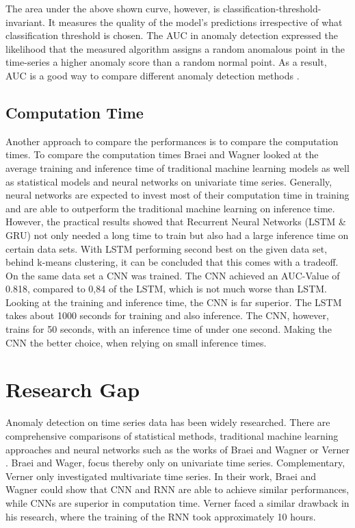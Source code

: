 The area under the above shown curve, however, is classification-threshold-invariant. It measures the quality of the model's predictions irrespective of what classification threshold is chosen. The AUC in anomaly detection expressed the likelihood that the measured algorithm assigns a random anomalous point in the time-series a higher anomaly score than a random normal point. As a result, AUC is a good way to compare different anomaly detection methods \parencite{Braei2020}.

\subsection{Computation Time}
Another approach to compare the performances is to compare the computation times. To compare the computation times Braei and Wagner \parencite*{Braei2020} looked at the average training and inference time of traditional machine learning models as well as  statistical models and neural networks on univariate time series. Generally, neural networks are expected to invest most of their computation time in training and are able to outperform the traditional machine learning on inference time. However, the practical results showed that Recurrent Neural Networks (LSTM \& GRU) not only needed a long time to train but also had a large inference time on certain data sets. With LSTM performing second best on the given data set, behind k-means clustering, it can be concluded that this comes with a tradeoff. On the same data set a CNN was trained. The CNN achieved an AUC-Value of 0.818, compared to 0,84 of the LSTM, which is not much worse than LSTM. Looking at the training and inference time, the CNN is far superior. The LSTM takes about 1000 seconds for training and also inference. The CNN, however, trains for 50 seconds, with an inference time of under one second. Making the CNN the better choice, when relying on small inference times.

\section{Research Gap}
Anomaly detection on time series data has been widely researched. There are comprehensive comparisons of statistical methods, traditional machine learning approaches and neural networks such as the works of Braei and Wagner \parencite*{Braei2020} or Verner \parencite*{Verner2019}. Braei and Wager, focus thereby only on univariate time  series. Complementary, Verner only investigated multivariate time series. In their work, Braei and Wagner could show that CNN and RNN are able to achieve similar performances, while CNNs are superior in computation time. Verner faced a similar drawback in his research, where the training of the RNN took approximately 10 hours. 

